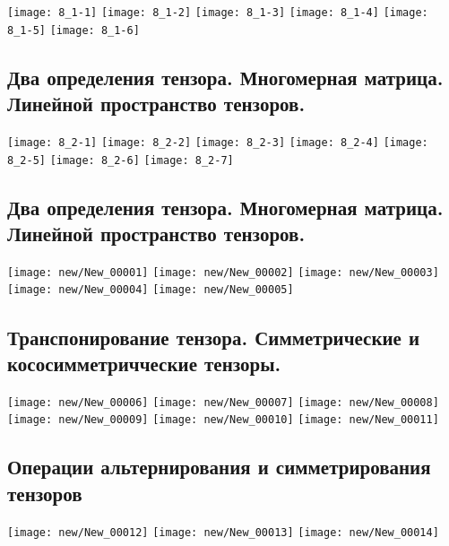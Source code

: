 \documentclass[../main.tex]{subfiles}
\begin{document}
		\texttt{[image: 8\_1-1]}	
		\n
		\texttt{[image: 8\_1-2]}	
		\n
		\texttt{[image: 8\_1-3]}	
		\n
		\texttt{[image: 8\_1-4]}	
		\n
		\texttt{[image: 8\_1-5]}	
		\n
		\texttt{[image: 8\_1-6]}	
		\n
	\subsection{Два определения тензора. Многомерная матрица. Линейной пространство тензоров.}
	 		\texttt{[image: 8\_2-1]}	
		\n
		\texttt{[image: 8\_2-2]}	
		\n
		\texttt{[image: 8\_2-3]}	
		\n
		\texttt{[image: 8\_2-4]}	
		\n
		\texttt{[image: 8\_2-5]}	
		\n
		\texttt{[image: 8\_2-6]}	
		\n
		\texttt{[image: 8\_2-7]}	
		
		
	\subsection{Два определения тензора. Многомерная матрица. Линейной пространство тензоров.}
	 		\texttt{[image: new/New\_00001]}	
		\n
		\texttt{[image: new/New\_00002]}	
		\n
		\texttt{[image: new/New\_00003]}		
		\n
		\texttt{[image: new/New\_00004]}	
		\n
		\texttt{[image: new/New\_00005]}	
		\n			
		
		
	\subsection{Транспонирование тензора. Симметрические и кососимметричческие тензоры.}
	 	\texttt{[image: new/New\_00006]}	
		\n
		\texttt{[image: new/New\_00007]}	
		\n
		\texttt{[image: new/New\_00008]}	
		\n
		\texttt{[image: new/New\_00009]}	
		\n
		\texttt{[image: new/New\_00010]}	
		\n
		\texttt{[image: new/New\_00011]}	
		\n			
		
		
	\subsection{Операции альтернирования и симметрирования тензоров}
	 	\texttt{[image: new/New\_00012]}	
		\n
		\texttt{[image: new/New\_00013]}	
		\n
		\texttt{[image: new/New\_00014]}	
\end{document}
